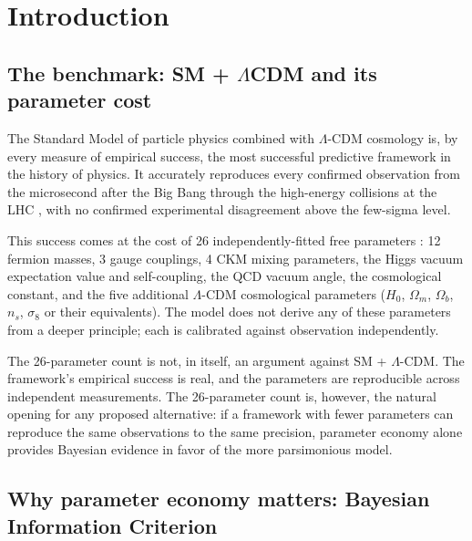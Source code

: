 
\section{Introduction}
\label{sec:intro}

\subsection{The benchmark: SM + $\Lambda$CDM and its parameter cost}
\label{sec:benchmark}

The Standard Model of particle physics combined with $\Lambda$-CDM
cosmology is, by every measure of empirical success, the most
successful predictive framework in the history of physics. It
accurately reproduces every confirmed observation from the
microsecond after the Big Bang \cite{Planck2018} through the
high-energy collisions at the LHC \cite{PDG2024}, with no
confirmed experimental disagreement above the few-sigma level.

This success comes at the cost of 26 independently-fitted free
parameters \cite{PDG2024}: 12 fermion masses, 3 gauge couplings, 4
CKM mixing parameters, the Higgs vacuum expectation value and
self-coupling, the QCD vacuum angle, the cosmological constant,
and the five additional $\Lambda$-CDM cosmological parameters
($H_0$, $\Omega_m$, $\Omega_b$, $n_s$, $\sigma_8$ or their
equivalents). The model does not derive any of these parameters from
a deeper principle; each is calibrated against observation
independently.

The 26-parameter count is not, in itself, an argument against
SM + $\Lambda$-CDM. The framework's empirical success is real, and
the parameters are reproducible across independent measurements.
The 26-parameter count is, however, the natural opening for any
proposed alternative: if a framework with fewer parameters can
reproduce the same observations to the same precision, parameter
economy alone provides Bayesian evidence in favor of the more
parsimonious model.

\subsection{Why parameter economy matters: Bayesian Information Criterion}
\label{sec:why_bic}

